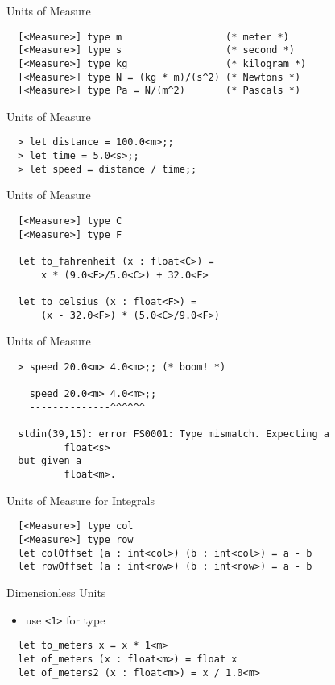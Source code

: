 \documentclass{beamer}
\begin{document}
\begin{frame}[fragile]{Units of Measure}
  \begin{verbatim}
  [<Measure>] type m                  (* meter *)
  [<Measure>] type s                  (* second *)
  [<Measure>] type kg                 (* kilogram *)
  [<Measure>] type N = (kg * m)/(s^2) (* Newtons *)
  [<Measure>] type Pa = N/(m^2)       (* Pascals *)
  \end{verbatim}
\end{frame}

\begin{frame}[fragile]{Units of Measure}
  \begin{verbatim}
  > let distance = 100.0<m>;;
  > let time = 5.0<s>;;
  > let speed = distance / time;;
  \end{verbatim}
\end{frame}

\begin{frame}[fragile]{Units of Measure}
  \begin{verbatim}
  [<Measure>] type C
  [<Measure>] type F

  let to_fahrenheit (x : float<C>) =
      x * (9.0<F>/5.0<C>) + 32.0<F>

  let to_celsius (x : float<F>) =
      (x - 32.0<F>) * (5.0<C>/9.0<F>)
  \end{verbatim}
\end{frame}

\begin{frame}[fragile]{Units of Measure}
  \small
  \begin{verbatim}
  > speed 20.0<m> 4.0<m>;; (* boom! *)

    speed 20.0<m> 4.0<m>;;
    --------------^^^^^^

  stdin(39,15): error FS0001: Type mismatch. Expecting a
          float<s>
  but given a
          float<m>.
  \end{verbatim}
\end{frame}

\begin{frame}[fragile]{Units of Measure for Integrals}
  \begin{verbatim}
  [<Measure>] type col
  [<Measure>] type row
  let colOffset (a : int<col>) (b : int<col>) = a - b
  let rowOffset (a : int<row>) (b : int<row>) = a - b
  \end{verbatim}
\end{frame}

\begin{frame}[fragile]{Dimensionless Units}
  \begin{itemize}[<+->]
    \item use \texttt{<1>} for type
  \end{itemize}
  \begin{verbatim}
  let to_meters x = x * 1<m>
  let of_meters (x : float<m>) = float x
  let of_meters2 (x : float<m>) = x / 1.0<m>
  \end{verbatim}
\end{frame}
\end{document}
